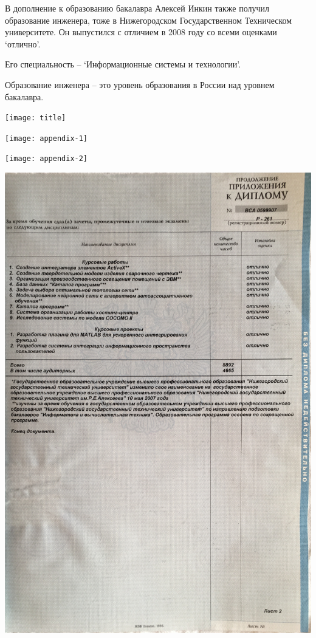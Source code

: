 
В дополнение к образованию бакалавра Алексей Инкин также получил образование инженера, тоже в Нижегородском Государственном Техническом университете.
Он выпустился с отличием в 2008 году со всеми оценками `отлично'.

Его специальность -- `Информационные системы и технологии'.

Образование инженера -- это уровень образования в России над уровнем бакалавра.



\begin{center}
    \texttt{[image: title]}
\end{center}
\pagebreak

\begin{center}
    \texttt{[image: appendix-1]}
\end{center}
\pagebreak

\begin{center}
    \texttt{[image: appendix-2]}
\end{center}
\pagebreak

\begin{center}
    \includegraphics[width=38em]{appendix-3}
\end{center}

\pagebreak
